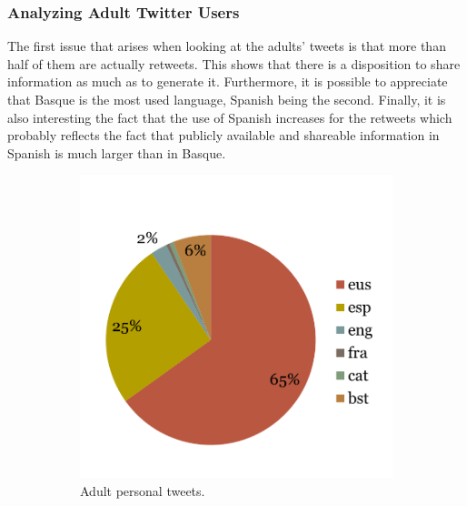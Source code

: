 \documentclass[information,article,submit,moreauthors,pdftex,10pt,a4paper]{Definitions/mdpi}
\begin{document}
\subsubsection{Analyzing Adult Twitter Users}

The first issue that arises when looking at the adults' tweets is that more than half of them are actually retweets. This shows that there is a disposition to share information as much as to generate it. Furthermore, it is possible to appreciate that Basque is the most used language, Spanish being the second. Finally, it is also interesting the fact that the use of Spanish increases for the retweets which probably reflects the fact that publicly available and shareable information in Spanish is much larger than in Basque.

\begin{figure}[H]
  \centering
  \begin{subfigure}[b]{0.48\linewidth}
    \includegraphics[width=\linewidth]{txio_heldu}
    \caption{Adult personal tweets.}
  \end{subfigure}
  \begin{subfigure}[b]{0.48\linewidth}

\end{subfigure}
\end{figure}
\end{document}

